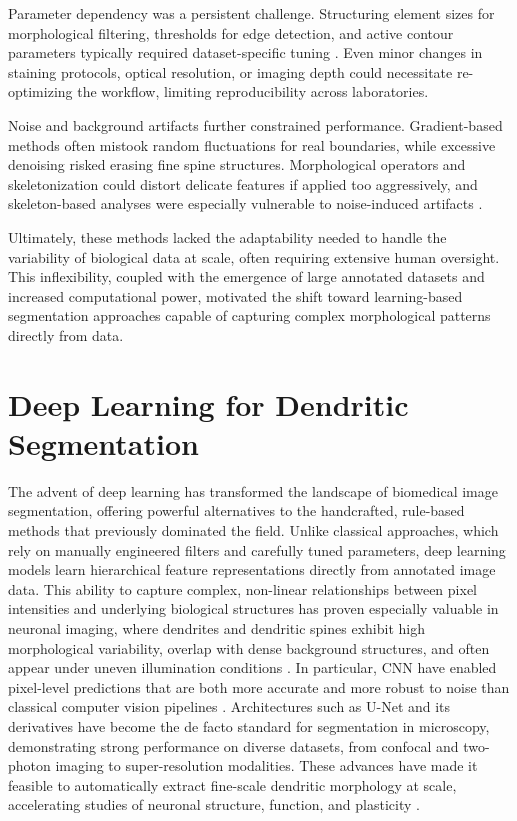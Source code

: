 Parameter dependency was a persistent challenge. Structuring element sizes for morphological filtering, thresholds for edge detection, and active contour parameters typically required dataset-specific tuning \cite{Weaver_2004}. Even minor changes in staining protocols, optical resolution, or imaging depth could necessitate re-optimizing the workflow, limiting reproducibility across laboratories.

Noise and background artifacts further constrained performance. Gradient-based methods often mistook random fluctuations for real boundaries, while excessive denoising risked erasing fine spine structures. Morphological operators and skeletonization could distort delicate features if applied too aggressively, and skeleton-based analyses were especially vulnerable to noise-induced artifacts \cite{Basu_2018, Zhang_2016}.

Ultimately, these methods lacked the adaptability needed to handle the variability of biological data at scale, often requiring extensive human oversight. This inflexibility, coupled with the emergence of large annotated datasets and increased computational power, motivated the shift toward learning-based segmentation approaches capable of capturing complex morphological patterns directly from data.

\section{Deep Learning for Dendritic Segmentation}
The advent of deep learning has transformed the landscape of biomedical image segmentation, offering powerful alternatives to the handcrafted, rule-based methods that previously dominated the field. Unlike classical approaches, which rely on manually engineered filters and carefully tuned parameters, deep learning models learn hierarchical feature representations directly from annotated image data. This ability to capture complex, non-linear relationships between pixel intensities and underlying biological structures has proven especially valuable in neuronal imaging, where dendrites and dendritic spines exhibit high morphological variability, overlap with dense background structures, and often appear under uneven illumination conditions \cite{Weaver_2004, Okabe_2020, Roszkowska_2016}. In particular, \gls{CNN} have enabled pixel-level predictions that are both more accurate and more robust to noise than classical computer vision pipelines \cite{Shea_2015}. Architectures such as U-Net and its derivatives have become the de facto standard for segmentation in microscopy, demonstrating strong performance on diverse datasets, from confocal and two-photon imaging to super-resolution modalities. These advances have made it feasible to automatically extract fine-scale dendritic morphology at scale, accelerating studies of neuronal structure, function, and plasticity \cite{Basu_2018, Fernholz_2024}.

